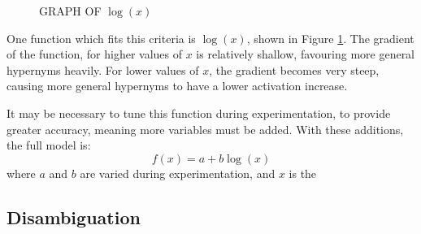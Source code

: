 \documentclass[]{article}
\begin{document}
\begin{figure}[h]
\caption{GRAPH OF $\log(x)$}
\label{fig:logGraph}
\end{figure}

One function which fits this criteria is $\log(x)$, shown in Figure \ref{fig:logGraph}. The gradient of the function, for higher values of $x$ is relatively shallow, favouring more general hypernyms heavily. For lower values of $x$, the gradient becomes very steep, causing more general hypernyms to have a lower activation increase.

It may be necessary to tune this function during experimentation, to provide greater accuracy, meaning more variables must be added. With these additions, the full model is:
\[f(x) = a + b\log(x)\]
where $a$ and $b$ are varied during experimentation, and $x$ is the 

\subsection{Disambiguation}
\label{sec:ImplementedDisambiguation}

\newpage


\end{document}
